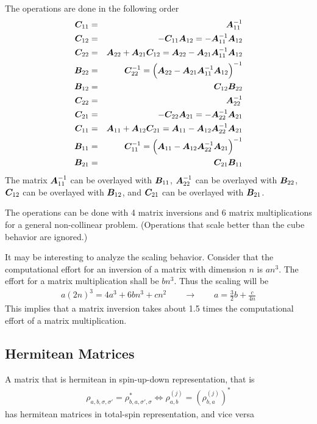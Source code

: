 \documentclass[11pt,a4paper]{report}
\begin{document}
The operations are done in the following order
\begin{eqnarray*}
\bm{C}_{11}&=&\bm{A}_{11}^{-1}
\nonumber\\
\bm{C}_{12}&=&-\bm{C}_{11}\bm{A}_{12}=-\bm{A}_{11}^{-1}\bm{A}_{12}
\nonumber\\
\bm{C}_{22}&=&\bm{A}_{22}+\bm{A}_{21}\bm{C}_{12}
=\bm{A}_{22}-\bm{A}_{21}\bm{A}_{11}^{-1}\bm{A}_{12}
\nonumber\\
\bm{B}_{22}&=&\bm{C}_{22}^{-1}
=\Bigl(\bm{A}_{22}-\bm{A}_{21}\bm{A}_{11}^{-1}\bm{A}_{12}\Bigr)^{-1}
\nonumber\\
\bm{B}_{12}&=&\bm{C}_{12}\bm{B}_{22}
\nonumber\\
\bm{C}_{22}&=&\bm{A}_{22}^{-1}
\nonumber\\
\bm{C}_{21}&=&-\bm{C}_{22}\bm{A}_{21}=-\bm{A}_{22}^{-1}\bm{A}_{21}
\nonumber\\
\bm{C}_{11}&=&\bm{A}_{11}+\bm{A}_{12}\bm{C}_{21}
=\bm{A}_{11}-\bm{A}_{12}\bm{A}_{22}^{-1}\bm{A}_{21}
\nonumber\\
\bm{B}_{11}&=&\bm{C}_{11}^{-1}
=\Bigl(\bm{A}_{11}-\bm{A}_{12}\bm{A}_{22}^{-1}\bm{A}_{21}\Bigr)^{-1}
\nonumber\\
\bm{B}_{21}&=&\bm{C}_{21}\bm{B}_{11}
\nonumber\\
\end{eqnarray*}
The matrix $\bm{A}_{11}^{-1}$ can be overlayed with $\bm{B}_{11}$,
$\bm{A}_{22}^{-1}$ can be overlayed with $\bm{B}_{22}$,
$\bm{C}_{12}$ can be overlayed with $\bm{B}_{12}$,
and $\bm{C}_{21}$ can be overlayed with $\bm{B}_{21}$.


The operations can be done with 4 matrix inversions and 6 matrix
multiplications for a general non-collinear problem. (Operations that
scale better than the cube behavior are ignored.)


It may be interesting to analyze the scaling behavior.  Consider that
the computational effort for an inversion of a matrix with dimension
$n$ is $an^3$. The effort for a matrix multiplication shall be $bn^3$.
Thus the scaling will be
\begin{eqnarray}
a(2n)^3=4a^3+6bn^3+cn^2\qquad\rightarrow\qquad a=\frac{3}{2}b+\frac{c}{4n}
\end{eqnarray}
This implies that a matrix inversion takes about 1.5 times the
computational effort of a matrix multiplication.

\subsection{Hermitean Matrices}
A matrix that is hermitean in spin-up-down representation, that is
\begin{eqnarray}
\rho_{a,b,\sigma,\sigma'}=\rho^*_{b,a,\sigma',\sigma}
\Leftrightarrow
\rho^{(j)}_{a,b}=\left(\rho^{(j)}_{b,a}\right)^*
\end{eqnarray}
has hermitean matrices in total-spin representation, and vice versa
\end{document}
